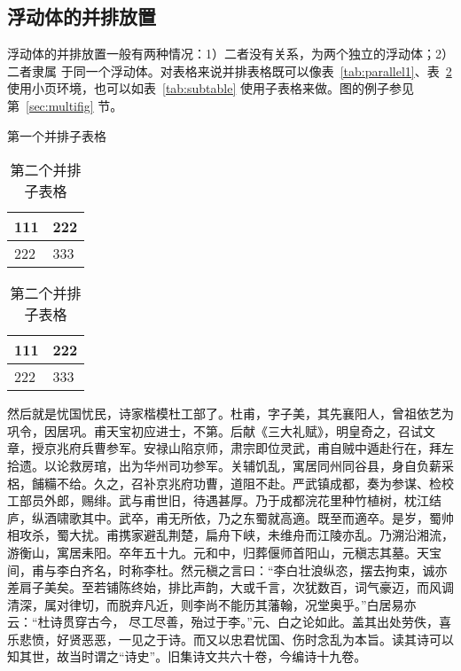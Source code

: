 \documentclass[../Main/thesis.tex]{subfiles}
\begin{document}
\subsection{浮动体的并排放置}
浮动体的并排放置一般有两种情况：1）二者没有关系，为两个独立的浮动体；2）二者隶属
于同一个浮动体。对表格来说并排表格既可以像表~\ref{tab:parallel1}、表~\ref{tab:parallel2}
使用小页环境，也可以如表~\ref{tab:subtable} 使用子表格来做。图的例子参见第~\ref{sec:multifig} 节。
\begin{table}[ht]
  \noindent\begin{minipage}{0.5\textwidth}
    \centering
    \caption{第一个并排子表格}
    \label{tab:parallel1}
    \begin{tabular}{p{2cm}p{2cm}}
      \toprule[1.5pt]
      111 & 222 \\\midrule[1pt]
      222 & 333 \\\bottomrule[1.5pt]
    \end{tabular}
  \end{minipage}
  \begin{minipage}{0.5\textwidth}
    \centering
    \caption{第二个并排子表格}
    \label{tab:parallel2}
    \begin{tabular}{p{2cm}p{2cm}}
      \toprule[1.5pt]
      111 & 222 \\\midrule[1pt]
      222 & 333 \\\bottomrule[1.5pt]
    \end{tabular}
  \end{minipage}
\end{table}

然后就是忧国忧民，诗家楷模杜工部了。杜甫，字子美，其先襄阳人，曾祖依艺为巩令，因居巩。甫天宝初应进士，不第。后献《三大礼赋》，明皇奇之，召试文章，授京兆府兵曹参军。安禄山陷京师，肃宗即位灵武，甫自贼中遁赴行在，拜左拾遗。以论救房琯，出为华州司功参军。关辅饥乱，寓居同州同谷县，身自负薪采梠，餔糒不给。久之，召补京兆府功曹，道阻不赴。严武镇成都，奏为参谋、检校工部员外郎，赐绯。武与甫世旧，待遇甚厚。乃于成都浣花里种竹植树，枕江结庐，纵酒啸歌其中。武卒，甫无所依，乃之东蜀就高適。既至而適卒。是岁，蜀帅相攻杀，蜀大扰。甫携家避乱荆楚，扁舟下峡，未维舟而江陵亦乱。乃溯沿湘流，游衡山，寓居耒阳。卒年五十九。元和中，归葬偃师首阳山，元稹志其墓。天宝间，甫与李白齐名，时称李杜。然元稹之言曰：“李白壮浪纵恣，摆去拘束，诚亦差肩子美矣。至若铺陈终始，排比声韵，大或千言，次犹数百，词气豪迈，而风调清深，属对律切，而脱弃凡近，则李尚不能历其藩翰，况堂奥乎。”白居易亦云：“杜诗贯穿古今，  尽工尽善，殆过于李。”元、白之论如此。盖其出处劳佚，喜乐悲愤，好贤恶恶，一见之于诗。而又以忠君忧国、伤时念乱为本旨。读其诗可以知其世，故当时谓之“诗史”。旧集诗文共六十卷，今编诗十九卷。
\end{document}
